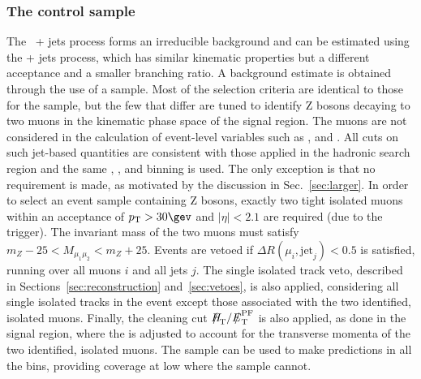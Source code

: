 \subsubsection{The \texorpdfstring{\mmj}{di-muon plus jets} control sample}

The \znunu\ + jets process forms an irreducible background and can be
estimated using the \zmumu + jets process, which has similar kinematic
properties but a different acceptance and a smaller branching ratio. A
background estimate is obtained through the use of a \mmj sample. Most
of the selection criteria are identical to those for the \mj sample,
but the few that differ are tuned to identify Z bosons decaying to two
muons in the kinematic phase space of the signal region. The muons are
not considered in the calculation of event-level variables such as
\scalht, \mht and \alphat. All cuts on such jet-based quantities are
consistent with those applied in the hadronic search region and the
same \njet, \nb, and \scalht binning is used. The only exception is
that no \alphat requirement is made, as motivated by the discussion in
Sec.~\ref{sec:larger}. In order to select an event sample containing Z
bosons, exactly two tight isolated muons within an acceptance of $\Pt
> 30\gev$ and $|\eta| < 2.1$ are required (due to the trigger). The
invariant mass of the two muons must satisfy $m_{Z} - 25 <
M_{\mu_1\mu_2} < m_{Z} + 25$. Events are vetoed if $\Delta
R(\mu_{i},\textrm{jet}_j) < 0.5$ is satisfied, running over all muons
$i$ and all jets $j$. The single isolated track veto, described in
Sections~\ref{sec:reconstruction} and~\ref{sec:vetoes}, is also
applied, considering all single isolated tracks in the event except
those associated with the two identified, isolated muons. Finally, the
cleaning cut $\mht/\pfmet$ is also applied, as done in the signal
region, where the \pfmet is adjusted to account for the transverse
momenta of the two identified, isolated muons. The \mmj sample can be
used to make predictions in all the \scalht bins, providing coverage
at low \scalht where the \gj sample cannot.


